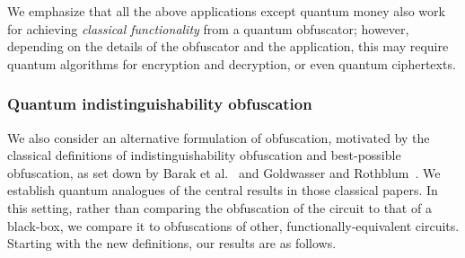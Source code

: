 \documentclass[envcountsame]{llncs}
\numberwithin{equation}{section}
\begin{document}
We emphasize that all the above applications except quantum money also work for achieving \emph{classical functionality} from a quantum obfuscator; however, depending on the details of the obfuscator and the application, this may require quantum algorithms for encryption and decryption, or even quantum ciphertexts.


\subsubsection{Quantum indistinguishability obfuscation}

We also consider an alternative formulation of obfuscation, motivated by the classical definitions of indistinguishability obfuscation and best-possible obfuscation, as set down by Barak et al.~\cite{BGIRSVY12} and Goldwasser and Rothblum~\cite{GR07}. We establish quantum analogues of the central results in those classical papers. In this setting, rather than comparing the obfuscation of the circuit to that of a black-box, we compare it to obfuscations of other, functionally-equivalent circuits. Starting with the new definitions, our results are as follows.
\end{document}
